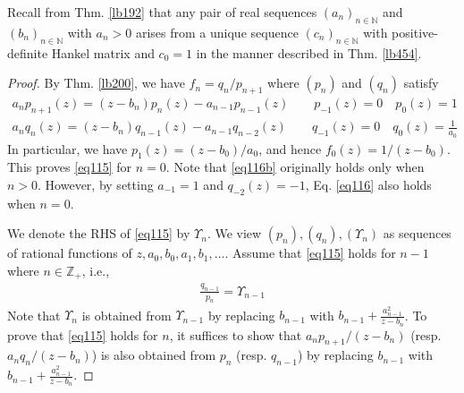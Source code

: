 \documentclass[12pt,b5paper,notitlepage]{article}
\theoremstyle{definition}
\theoremstyle{plain}
\newcommand{\Nbb}{\mathbb N}
\newcommand{\Zbb}{\mathbb Z}
\numberwithin{equation}{section}
\begin{document}
Recall from Thm. \ref{lb192} that any pair of real sequences $(a_n)_{n\in\Nbb}$ and $(b_n)_{n\in\Nbb}$ with $a_n>0$ arises from a unique sequence $(c_n)_{n\in\Nbb}$ with positive-definite Hankel matrix and $c_0=1$ in the manner described in Thm. \ref{lb454}.

\begin{proof}
By Thm. \ref{lb200}, we have $f_n=q_n/p_{n+1}$ where $(p_n)$ and $(q_n)$ satisfy
\begin{subequations}\label{eq116}
\begin{gather}
a_np_{n+1}(z)=(z-b_n)p_n(z)-a_{n-1}p_{n-1}(z)\qquad p_{-1}(z)=0\quad p_0(z)=1\label{eq116a}\\
a_nq_n(z)=(z-b_n)q_{n-1}(z)-a_{n-1}q_{n-2}(z)\qquad q_{-1}(z)=0\quad q_0(z)=\frac{1}{a_0}\label{eq116b}
\end{gather}
\end{subequations}
In particular, we have $p_1(z)=(z-b_0)/a_0$, and hence $f_0(z)=1/(z-b_0)$. This proves \eqref{eq115} for $n=0$. Note that \eqref{eq116b} originally holds only when $n>0$. However, by setting $a_{-1}=1$ and $q_{-2}(z)=-1$, Eq. \eqref{eq116} also holds when $n=0$. 

We denote the RHS of \eqref{eq115} by $\Upsilon_n$. We view $(p_n),(q_n),(\Upsilon_n)$ as sequences of rational functions of $z,a_0,b_0,a_1,b_1,\dots$. Assume that \eqref{eq115} holds for $n-1$ where $n\in\Zbb_+$, i.e.,
\begin{align*}
\frac{q_{n-1}}{p_n}=\Upsilon_{n-1}
\end{align*}
Note that $\Upsilon_n$ is obtained from $\Upsilon_{n-1}$ by replacing $b_{n-1}$ with $b_{n-1}+\frac{a_{n-1}^2}{z-b_n}$. To prove that \eqref{eq115} holds for $n$, it suffices to show that $a_np_{n+1}/(z-b_n)$ (resp. $a_nq_n/(z-b_n)$) is also obtained from $p_n$ (resp. $q_{n-1}$) by replacing $b_{n-1}$ with $b_{n-1}+\frac{a_{n-1}^2}{z-b_n}$. 


\end{proof}
\end{document}
